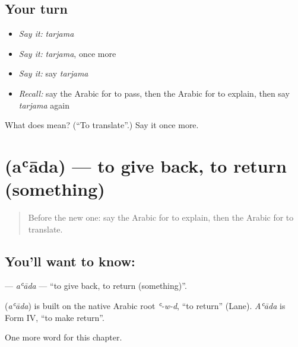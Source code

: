 \subsection*{Your turn}
\begin{itemize}
\raggedright
  \item \emph{Say it:} \emph{tarjama}
  \item \emph{Say it:} \emph{tarjama}, once more
  \item \emph{Say it:} say \emph{tarjama}
  \item \emph{Recall:} say the Arabic for to pass, then the Arabic for to explain, then say \emph{tarjama} again
\end{itemize}

\begin{tcolorbox}[breakable,colback=teal!4,colframe=teal!35!black,title={Before you move on}]
What does  mean? (\textquotedblleft{}To translate\textquotedblright{}.) Say it once more.
\end{tcolorbox}
\section[\texorpdfstring{\ar{أعاد} (aʿāda)}{أعاد (aʿāda)}]{ (aʿāda) — to give back, to return (something)}

\label{lesson:AR-C256-aada}



\begin{quote}
Before the new one: say the Arabic for to explain, then the Arabic for to translate.
\end{quote}

\subsection*{You'll want to know: }
\textbf{} — \emph{aʿāda} — \textquotedblleft{}to give back, to return (something)\textquotedblright{}.

\begin{cousinweb}
\textbf{} (\emph{aʿāda}) is built on the native Arabic root \emph{ʿ-w-d}, \textquotedblleft{}to return\textquotedblright{} (Lane). \emph{Aʿāda} is Form IV, \textquotedblleft{}to make return\textquotedblright{}.
\end{cousinweb}

\begin{grammarlens}[title={What you've built}]
One more word for this chapter.
\end{grammarlens}

